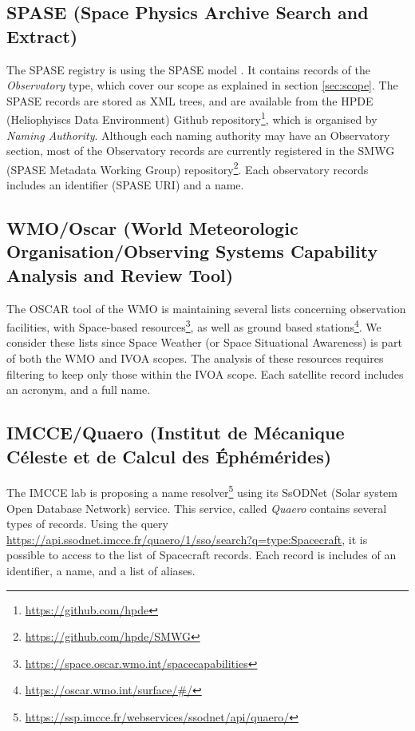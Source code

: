 \documentclass[11pt,a4paper]{ivoa}
\begin{document}
\subsection{SPASE (Space Physics Archive Search and Extract)} 
The SPASE registry is using the SPASE model \citep{Roberts:2018bi}. 
It contains records of the \emph{Observatory} type, which cover our
scope as explained in section \ref{sec:scope}. The SPASE records 
are stored as XML trees, and are available from the HPDE (Heliophyiscs
Data Environment) Github repository\footnote{\url{https://github.com/hpde}},
which is organised by \emph{Naming Authority}. Although each naming 
authority may have an Observatory section, most of the Observatory 
records are currently registered in the SMWG (SPASE Metadata Working
Group) repository\footnote{\url{https://github.com/hpde/SMWG}}.
Each observatory records includes an identifier (SPASE URI) and a name. 

\subsection{WMO/Oscar (World Meteorologic Organisation/Observing Systems Capability Analysis and Review Tool)}
The OSCAR tool of the WMO is maintaining several lists concerning
observation facilities, with Space-based resources\footnote{\url{https://space.oscar.wmo.int/spacecapabilities}}, 
as well as ground based stations\footnote{\url{https://oscar.wmo.int/surface/\#/}}. 
We consider these lists since Space Weather (or Space Situational 
Awareness) is part of both the WMO and IVOA scopes. The analysis of these 
resources requires filtering to keep only those within the IVOA scope.  
Each satellite record includes an acronym, and a full name.  

\subsection{IMCCE/Quaero (Institut de M\'ecanique C\'eleste et de Calcul des \'Eph\'em\'erides)}
The IMCCE lab is proposing a name resolver\footnote{\url{https://ssp.imcce.fr/webservices/ssodnet/api/quaero/}} 
using its SsODNet (Solar system Open Database Network) service. This
service, called \emph{Quaero} contains several types of records. Using 
the query \url{https://api.ssodnet.imcce.fr/quaero/1/sso/search?q=type:Spacecraft}, 
it is possible to access to the list of Spacecraft records. Each 
record is includes of an identifier, a name, and a list of
aliases.
\end{document}

